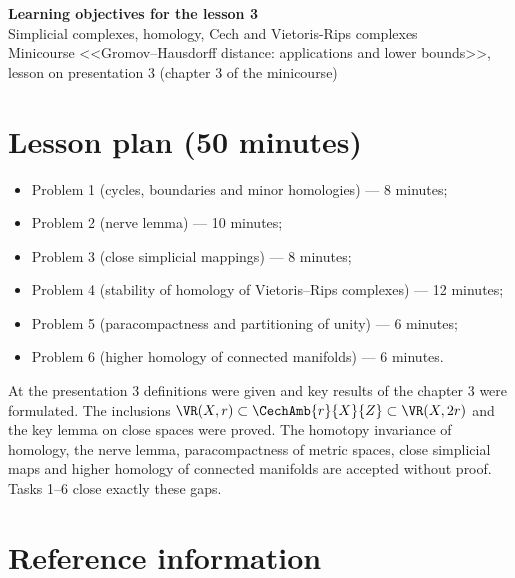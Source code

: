 \documentclass[a4paper,12pt]{report}
\begin{document}
\begin{center}
{\Large\bfseries Learning objectives for the lesson \textup{3}}\\[2mm]
{\large Simplicial complexes, homology, Cech and Vietoris-Rips complexes}\\[2mm]
{\small Minicourse <<Gromov--Hausdorff distance: applications and lower bounds>>, lesson on presentation \textup{3} (chapter \textup{3} of the minicourse)}
\end{center}

\section*{Lesson plan (\textup{50} minutes)}

\begin{itemize}[leftmargin=*]
\item Problem \textup{1} (cycles, boundaries and minor homologies) --- \textup{8} minutes\textup{;}
\item Problem \textup{2} (nerve lemma) --- \textup{10} minutes\textup{;}
\item Problem \textup{3} (close simplicial mappings) --- \textup{8} minutes\textup{;}
\item Problem \textup{4} (stability of homology of Vietoris--Rips complexes) --- \textup{12} minutes\textup{;}
\item Problem \textup{5} (paracompactness and partitioning of unity) --- \textup{6} minutes\textup{;}
\item Problem \textup{6} (higher homology of connected manifolds) --- \textup{6} minutes.
\end{itemize}

At the presentation \textup{3} definitions were given and key results of the chapter \textup{3} were formulated. The inclusions $\VR(X,r) \subset \CechAmb{r}{X}{Z} \subset \VR(X,2r)$ and the key lemma on close spaces were proved. The homotopy invariance of homology, the nerve lemma, paracompactness of metric spaces, close simplicial maps and higher homology of connected manifolds are accepted without proof. Tasks \textup{1}--\textup{6} close exactly these gaps.

\section*{Reference information}
\end{document}
